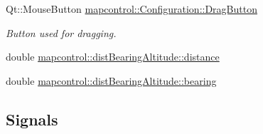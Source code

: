 \begin{DoxyCompactItemize}
\item 
\-Qt\-::\-Mouse\-Button \hyperlink{group___o_p_map_widget_ga18190e2acae7a12ba6b598cf25244acf}{mapcontrol\-::\-Configuration\-::\-Drag\-Button}
\begin{DoxyCompactList}\small\item\em \-Button used for dragging. \end{DoxyCompactList}\item 
double \hyperlink{group___o_p_map_widget_ga4f3ed7668339c6c63a158fe42d69f8ee}{mapcontrol\-::dist\-Bearing\-Altitude\-::distance}
\item 
double \hyperlink{group___o_p_map_widget_ga473dc356430fb4d398c78d0fdde33ad1}{mapcontrol\-::dist\-Bearing\-Altitude\-::bearing}
\end{DoxyCompactItemize}
\subsection*{\-Signals}
